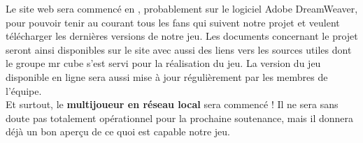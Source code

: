 \documentclass[10pt, titlepage]{report}
\begin{document}
Le site web sera commencé en , probablement sur le logiciel Adobe DreamWeaver, pour pouvoir tenir au courant tous les fans qui suivent notre projet et veulent télécharger les dernières versions de notre jeu. Les documents concernant le projet seront ainsi disponibles sur le site avec aussi des liens vers les sources utiles dont le groupe mr cube s'est servi pour la réalisation du jeu. La version du jeu disponible en ligne sera aussi mise à jour régulièrement par les membres de l'équipe. \\


 Et surtout, le \textbf{multijoueur en réseau local} sera commencé ! Il ne sera sans doute pas totalement opérationnel pour la prochaine soutenance, mais il donnera déjà un bon aperçu de ce quoi est capable notre jeu.
\end{document}
